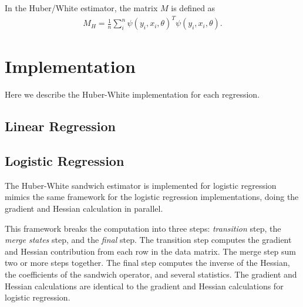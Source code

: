 \documentclass[12pt]{article}
\begin{document}
In the Huber/White estimator, the matrix $M$ is defined as
\begin{align}
M_{H} =\frac{1}{n} \sum_i^n \psi(y_i,x_i, \theta)^T  \psi(y_i,x_i, \theta).
\end{align}

%


\section{Implementation}

Here we describe the Huber-White implementation for each regression.  


\subsection{Linear Regression}

\subsection{Logistic Regression}
The Huber-White sandwich estimator is implemented for logistic regression mimics the same framework for the logistic regression implementations, doing the gradient and Hessian calculation in  parallel.  

This framework breaks the computation into three steps: \textit{transition} step, the \textit{merge states} step, and the \textit{final} step.  The transition step computes the gradient and Hessian contribution from each row in the data matrix. The merge step sum two or more steps together.  The final step computes the inverse of the Hessian, the coefficients of the sandwich operator, and several statistics.  The gradient and Hessian calculations are identical to the gradient and Hessian calculations for logistic regression.  
\end{document}
